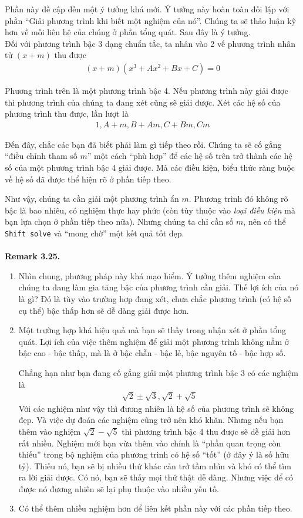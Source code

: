 \documentclass[a4paper,oneside]{book}
\numberwithin{equation}{chapter}
\begin{document}
Phần này đề cập đến một ý tưởng khá mới. Ý tưởng này hoàn toàn đối lập với phần ``Giải phương trình khi biết một nghiệm của nó''. Chúng ta sẽ thảo luận kỹ hơn về mối liên hệ của chúng ở phần tổng quát. Sau đây là ý tưởng.\\

Đối với phương trình bậc 3 dạng chuẩn tắc, ta nhân vào 2 vế phương trình nhân tử $\left( {x + m} \right)$ thu được
\begin{align}
\left( {x + m} \right)\left( {{x^3} + A{x^2} + Bx + C} \right) = 0
\end{align}

Phương trình trên là một phương trình bậc 4. Nếu phương trình này giải được thì phương trình của chúng ta đang xét cũng sẽ giải được. Xét các hệ số của phương trình thu được, lần lượt là
\begin{align}
1, A + m, B + Am, C + Bm, Cm
\end{align}

Đến đây, chắc các bạn đã biết phải làm gì tiếp theo rồi. Chúng ta sẽ cố gắng ``điều chỉnh tham số $m$'' một cách ``phù hợp'' để các hệ số trên trở thành các hệ số của một phương trình bậc 4 giải được. Mà các điều kiện, biểu thức ràng buộc về hệ số đã được thể hiện rõ ở phần tiếp theo.

Như vậy, chúng ta cần giải một phương trình ẩn $m$. Phương trình đó không rõ bậc là bao nhiêu, có nghiệm thực hay phức (còn tùy thuộc vào \textit{loại điều kiện} mà bạn lựa chọn ở phần tiếp theo nữa). Nhưng chúng ta chỉ cần số $m$, nên có thể \texttt{Shift solve} và ``mong chờ'' một kết quả tốt đẹp.\\
\\
\textbf{Remark 3.25.}
\begin{enumerate}
\item Nhìn chung, phương pháp này khá mạo hiểm. Ý tưởng thêm nghiệm của chúng ta đang làm gia tăng bậc của phương trình cần giải. Thế lợi ích của nó là gì? Đó là tùy vào trường hợp đang xét, chưa chắc phương trình (có hệ số cụ thể) bậc thấp hơn sẽ dễ dàng giải được hơn.
\item Một trường hợp khá hiệu quả mà bạn sẽ thấy trong nhận xét ở phần tổng quát. Lợi ích của việc thêm nghiệm để giải một phương trình không nằm ở bậc cao - bậc thấp, mà là ở bậc chẵn - bậc lẻ, bậc nguyên tố - bậc hợp số.

Chẳng hạn như bạn đang cố gắng giải một phương trình bậc 3 có các nghiệm là 
\begin{align}
\sqrt 2  \pm \sqrt 3 ,\sqrt 2  + \sqrt 5 
\end{align}
Với các nghiệm như vậy thì đương nhiên là hệ số của phương trình sẽ không đẹp. Và việc dự đoán các nghiệm cũng trở nên khó khăn. Nhưng nếu bạn thêm vào nghiệm $\sqrt 2  - \sqrt 5 $ thì phương trình bậc 4 thu được sẽ dễ giải hơn rất nhiều. Nghiệm mới bạn vừa thêm vào chính là ``phần quan trọng còn thiếu'' trong bộ nghiệm của phương trình có hệ số ``tốt'' (ở đây ý là số hữu tỷ). Thiếu nó, bạn sẽ bị nhiều thứ khác cản trở tầm nhìn và khó có thể tìm ra lời giải được. Có nó, bạn sẽ thấy mọi thứ thật dễ dàng. Nhưng việc để có được nó đương nhiên sẽ lại phụ thuộc vào nhiều yếu tố.
\item Có thể thêm nhiều nghiệm hơn để liên kết phần này với các phần tiếp theo.
\end{enumerate}
\end{document}
